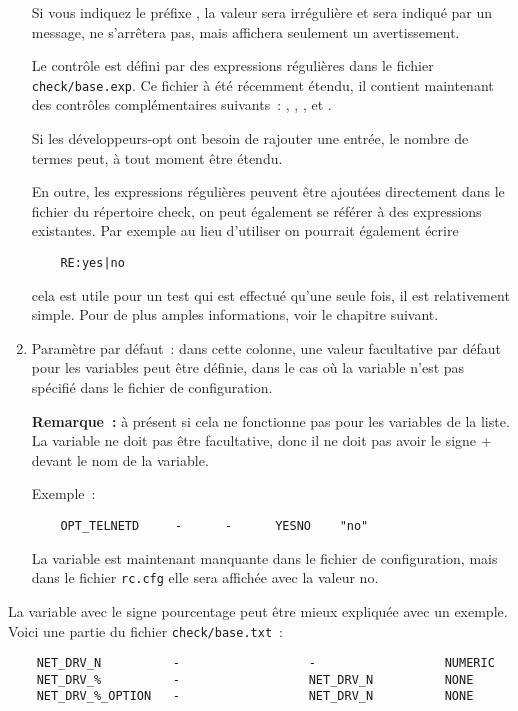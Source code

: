 \begin{enumerate}
  Si vous indiquez le préfixe \og{}\fg{}, la valeur sera irrégulière
  et sera indiqué par un message,  ne s’arrêtera pas, mais affichera
  seulement un avertissement.

  Le contrôle est défini par des expressions régulières dans le fichier
  \texttt{check/base.exp}. Ce fichier à été récemment étendu, il contient maintenant des
  contrôles complémentaires suivants~: , ,
  ,  et .

  Si les développeurs-opt ont besoin de rajouter une entrée, le nombre de termes
  peut, à tout moment être étendu.

  En outre, les expressions régulières peuvent être ajoutées directement dans
  le fichier du répertoire check, on peut également se référer à des expressions
  existantes. Par exemple au lieu d’utiliser  on pourrait également écrire
\begin{example}
\begin{verbatim}
    RE:yes|no
\end{verbatim}
\end{example}
cela est utile pour un test qui est effectué qu’une seule fois, il est
relativement simple. Pour de plus amples informations, voir le chapitre suivant.

\item Paramètre par défaut~: dans cette colonne, une valeur facultative par défaut
pour les variables peut être définie, dans le cas où la variable n'est pas spécifié dans
le fichier de configuration.

\textbf{Remarque~:} à présent si cela ne fonctionne pas pour les variables de la liste.
La variable ne doit pas être facultative, donc il ne doit pas avoir le signe \og{}+\fg{}
devant le nom de la variable.

Exemple~:
\begin{example}
\begin{verbatim}
    OPT_TELNETD     -      -      YESNO    "no"
\end{verbatim}
\end{example}

La variable  est maintenant manquante dans le fichier de configuration,
mais dans le fichier \texttt{rc.cfg} elle sera affichée avec la valeur \og{}no\fg{}.

\end{enumerate}

    La variable avec le signe pourcentage peut être mieux expliquée avec
    un exemple. Voici une partie du fichier \texttt{check/base.txt}~:
\begin{example}
\begin{verbatim}
    NET_DRV_N          -                  -                  NUMERIC
    NET_DRV_%          -                  NET_DRV_N          NONE
    NET_DRV_%_OPTION   -                  NET_DRV_N          NONE
\end{verbatim}
\end{example}

